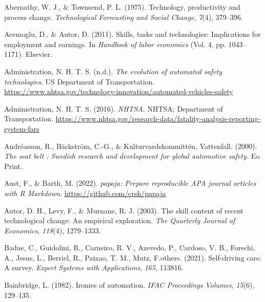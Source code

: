 \documentclass[
  man,floatsintext]{apa7}
\newlength{\cslhangindent}
\newlength{\cslentryspacingunit} %
\newenvironment{CSLReferences}[2] %
 {%
  \setlength{\parindent}{0pt}
  \ifodd #1
  \let\oldpar\par
  \def\par{\hangindent=\cslhangindent\oldpar}
  \fi
  \setlength{\parskip}{#2\cslentryspacingunit}
 }%
 {}
\begin{document}
\hypertarget{refs}{}
\begin{CSLReferences}{1}{0}
\leavevmode{}%
Abernathy, W. J., \& Townsend, P. L. (1975). Technology, productivity and process change. \emph{Technological Forecasting and Social Change}, \emph{7}(4), 379--396.

\leavevmode{}%
Acemoglu, D., \& Autor, D. (2011). Skills, tasks and technologies: Implications for employment and earnings. In \emph{Handbook of labor economics} (Vol. 4, pp. 1043--1171). Elsevier.

\leavevmode{}%
Administration, N. H. T. S. (n.d.). \emph{The evolution of automated safety technologies}. US Department of Transportation. \url{https://www.nhtsa.gov/technology-innovation/automated-vehicles-safety}

\leavevmode{}%
Administration, N. H. T. S. (2016). \emph{NHTSA}. NHTSA; Department of Transportation. \url{https://www.nhtsa.gov/research-data/fatality-analysis-reporting-system-fars}

\leavevmode{}%
Andréasson, R., Bäckström, C.-G., \& Kulturvardskommittén, Vattenfall. (2000). \emph{The seat belt : Swedish research and development for global automotive safety.} Eo Print.

\leavevmode{}%
Aust, F., \& Barth, M. (2022). \emph{{papaja}: {Prepare} reproducible {APA} journal articles with {R Markdown}}. \url{https://github.com/crsh/papaja}

\leavevmode{}%
Autor, D. H., Levy, F., \& Murnane, R. J. (2003). The skill content of recent technological change: An empirical exploration. \emph{The Quarterly Journal of Economics}, \emph{118}(4), 1279--1333.

\leavevmode{}%
Badue, C., Guidolini, R., Carneiro, R. V., Azevedo, P., Cardoso, V. B., Forechi, A., Jesus, L., Berriel, R., Paixao, T. M., Mutz, F.others. (2021). Self-driving cars: A survey. \emph{Expert Systems with Applications}, \emph{165}, 113816.

\leavevmode{}%
Bainbridge, L. (1982). Ironies of automation. \emph{IFAC Proceedings Volumes}, \emph{15}(6), 129--135.


\end{CSLReferences}
\end{document}
